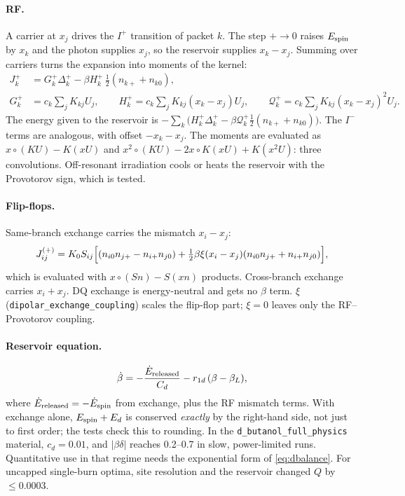 \documentclass[11pt]{article}
\newcommand{\Iplus}{I^{+}}
\newcommand{\Iminus}{I^{-}}
\newcommand{\code}[1]{\texttt{#1}}
\begin{document}
\paragraph{RF.} A carrier at \(x_j\) drives the \(\Iplus\) transition of packet \(k\). The step
\(+\to0\) raises \(E_{\rm spin}\) by \(x_k\) and the photon supplies \(x_j\), so the reservoir
supplies \(x_k-x_j\). Summing over carriers turns the expansion into moments of the kernel:
\begin{align}
J^+_k &= G^+_k\Delta^+_k - \beta H^+_k\,\tfrac12(n_{k+}+n_{k0}),\\
G^+_k &= c_k\textstyle\sum_jK_{kj}U_j,\qquad
H^+_k=c_k\textstyle\sum_jK_{kj}(x_k-x_j)U_j,\qquad
\mathcal Q^+_k=c_k\textstyle\sum_jK_{kj}(x_k-x_j)^2U_j .
\end{align}
The energy given to the reservoir is
\(-\sum_k\bigl(H^+_k\Delta^+_k-\beta\mathcal Q^+_k\tfrac12(n_{k+}+n_{k0})\bigr)\). The \(\Iminus\)
terms are analogous, with offset \(-x_k-x_j\). The moments are evaluated as
\(x\circ(KU)-K(xU)\) and \(x^2\circ(KU)-2x\circ K(xU)+K(x^2U)\): three convolutions. Off-resonant
irradiation cools or heats the reservoir with the Provotorov sign, which is tested.

\paragraph{Flip-flops.} Same-branch exchange carries the mismatch \(x_i-x_j\):
\begin{equation}
J^{(+)}_{ij}=K_0S_{ij}\Bigl[(n_{i0}n_{j+}-n_{i+}n_{j0})+\tfrac12\beta\xi(x_i-x_j)(n_{i0}n_{j+}+n_{i+}n_{j0})\Bigr],
\end{equation}
which is evaluated with \(x\circ(Sn)-S(xn)\) products. Cross-branch exchange carries
\(x_i+x_j\). DQ exchange is energy-neutral and gets no \(\beta\) term. \(\xi\)
(\code{dipolar\_exchange\_coupling}) scales the flip-flop part; \(\xi=0\) leaves only the
RF--Provotorov coupling.

\paragraph{Reservoir equation.}
\begin{equation}
\dot\beta = -\frac{\dot E_{\rm released}}{C_d}-r_{1d}\,(\beta-\beta_L),
\end{equation}
where \(\dot E_{\rm released}=-\dot E_{\rm spin}\) from exchange, plus the RF mismatch terms. With
exchange alone, \(E_{\rm spin}+E_d\) is conserved \emph{exactly} by the right-hand side, not just
to first order; the tests check this to rounding. In the \code{d\_butanol\_full\_physics}
material, \(c_d=0.01\), and \(|\beta\delta|\) reaches 0.2--0.7 in slow, power-limited runs.
Quantitative use in that regime needs the exponential form of \cref{eq:dbalance}. For uncapped
single-burn optima, site resolution and the reservoir changed \(Q\) by \(\le0.0003\).
\end{document}

